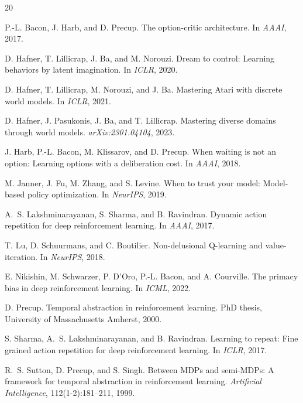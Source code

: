 \documentclass[10pt,letterpaper]{article}
\begin{document}

\begin{thebibliography}{20}

P.-L. Bacon, J. Harb, and D. Precup.
\newblock The option-critic architecture.
\newblock In \emph{AAAI}, 2017.

D. Hafner, T. Lillicrap, J. Ba, and M. Norouzi.
\newblock Dream to control: Learning behaviors by latent imagination.
\newblock In \emph{ICLR}, 2020.

D. Hafner, T. Lillicrap, M. Norouzi, and J. Ba.
\newblock Mastering {A}tari with discrete world models.
\newblock In \emph{ICLR}, 2021.

D. Hafner, J. Pasukonis, J. Ba, and T. Lillicrap.
\newblock Mastering diverse domains through world models.
\newblock \emph{arXiv:2301.04104}, 2023.

J. Harb, P.-L. Bacon, M. Klissarov, and D. Precup.
\newblock When waiting is not an option: Learning options with a deliberation cost.
\newblock In \emph{AAAI}, 2018.

M. Janner, J. Fu, M. Zhang, and S. Levine.
\newblock When to trust your model: Model-based policy optimization.
\newblock In \emph{NeurIPS}, 2019.

A.~S. Lakshminarayanan, S. Sharma, and B. Ravindran.
\newblock Dynamic action repetition for deep reinforcement learning.
\newblock In \emph{AAAI}, 2017.

T. Lu, D. Schuurmans, and C. Boutilier.
\newblock Non-delusional {Q}-learning and value-iteration.
\newblock In \emph{NeurIPS}, 2018.

E. Nikishin, M. Schwarzer, P. D'Oro, P.-L. Bacon, and A. Courville.
\newblock The primacy bias in deep reinforcement learning.
\newblock In \emph{ICML}, 2022.

D. Precup.
\newblock Temporal abstraction in reinforcement learning.
\newblock PhD thesis, University of Massachusetts Amherst, 2000.

S. Sharma, A.~S. Lakshminarayanan, and B. Ravindran.
\newblock Learning to repeat: Fine grained action repetition for deep reinforcement learning.
\newblock In \emph{ICLR}, 2017.

R.~S. Sutton, D. Precup, and S. Singh.
\newblock Between {MDP}s and semi-{MDP}s: A framework for temporal abstraction in reinforcement learning.
\newblock \emph{Artificial Intelligence}, 112(1-2):181--211, 1999.

\end{thebibliography}
\end{document}
